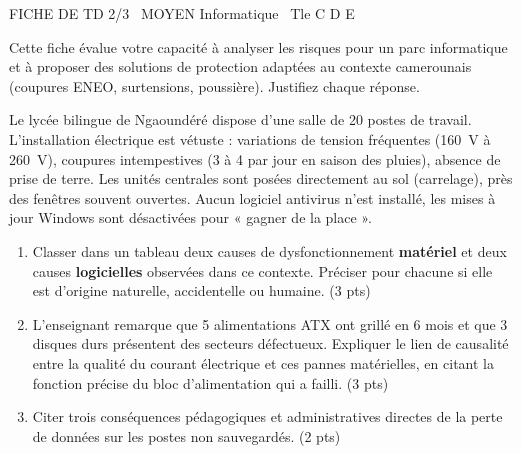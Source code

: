 \documentclass[11pt]{article}
\begin{document}
\begin{tcolorbox}[enhanced,colback=popink,colframe=popink,arc=10pt,boxrule=0pt,left=12pt,right=12pt,top=9pt,bottom=9pt]
{\color{white}\popxbold\small FICHE DE TD 2/3 \textbullet\ MOYEN \hfill Informatique \textbullet\ Tle C D E\par}
\end{tcolorbox}
\vspace{4pt}
\noindent Cette fiche évalue votre capacité à analyser les risques pour un parc informatique et à proposer des solutions de protection adaptées au contexte camerounais (coupures ENEO, surtensions, poussière). Justifiez chaque réponse.

\begin{exercice}
Le lycée bilingue de Ngaoundéré dispose d'une salle de 20 postes de travail. L'installation électrique est vétuste : variations de tension fréquentes (\SI{160}{\volt} à \SI{260}{\volt}), coupures intempestives (3 à 4 par jour en saison des pluies), absence de prise de terre. Les unités centrales sont posées directement au sol (carrelage), près des fenêtres souvent ouvertes. Aucun logiciel antivirus n'est installé, les mises à jour Windows sont désactivées pour « gagner de la place ».
\begin{enumerate}
    \item Classer dans un tableau deux causes de dysfonctionnement \textbf{matériel} et deux causes \textbf{logicielles} observées dans ce contexte. Préciser pour chacune si elle est d'origine naturelle, accidentelle ou humaine. (3 pts)
    \item L'enseignant remarque que 5 alimentations ATX ont grillé en 6 mois et que 3 disques durs présentent des secteurs défectueux. Expliquer le lien de causalité entre la qualité du courant électrique et ces pannes matérielles, en citant la fonction précise du bloc d'alimentation qui a failli. (3 pts)
    \item Citer trois conséquences pédagogiques et administratives directes de la perte de données sur les postes non sauvegardés. (2 pts)
\end{enumerate}
\end{exercice}
\end{document}
